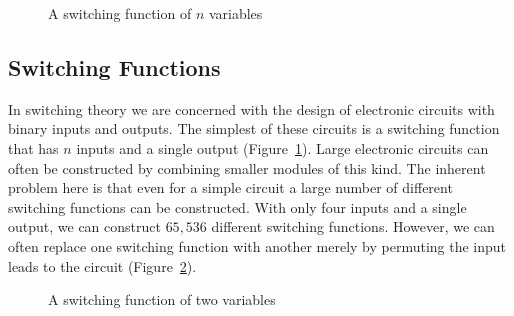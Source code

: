  
\begin{figure}[thb]


\begin{center}
\end{center}

\caption{A switching function of $n$ variables}
\label{nvariables}
\end{figure}
 
 
 
\subsection*{Switching Functions}
 
 
 
In switching theory we are concerned with the design of electronic
circuits with binary inputs and outputs. The simplest of these
circuits is a switching function that has $n$ inputs and a single output
(Figure~\ref{nvariables}). Large electronic circuits can often be 
constructed by combining smaller modules of this kind. The inherent
problem here is that even for a simple circuit a large number of
different switching functions can be constructed.  With only four
inputs and a single output, we can construct $65,536$ different
switching functions. However, we can often replace one switching
function with another merely by permuting the input leads to the
circuit (Figure~\ref{twovar}). 
 
 
\begin{figure}[htb]

\begin{center}
\end{center}

\caption{A switching function of two variables}
\label{twovar}
\end{figure}
 

